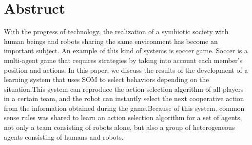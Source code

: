 \chapter*{Abstruct}
With the progress of technology, the realization of a symbiotic society with human beings and robots sharing the same environment has become an important subject. An example of this kind of systems is soccer game. Soccer is a multi-agent game that requires strategies by taking into account each member's position and actions. In this paper, we discuss the results of the development of a learning system that uses SOM to select behaviors depending on the situation.This system can reproduce the action selection algorithm of all players in a certain team, and the robot can instantly select the next cooperative action from the information obtained during the game.Because of this system, common sense rules was shared to learn an action selection algorithm for a set of agents, not only a team consisting of robots alone, but also a group of heterogeneous agents consisting of humans and robots.